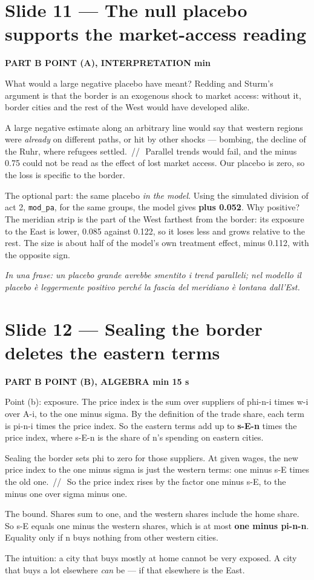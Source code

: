 \documentclass[11pt,a4paper]{article}
\newcommand{\slide}[3]{\Needspace{14\baselineskip}\section{#1}\textcolor{unicared}{\small\bfseries\MakeUppercase{#3}\quad\textperiodcentered\quad #2}\par}
\newcommand{\idea}[1]{\par{\small\itshape\color{unicablue}In una frase: #1}\par}
\newcommand{\pause}{\textcolor{unicared}{\,/\!/\,}}
\begin{document}
\slide{Slide 11 --- The null placebo supports the market-access reading}{1 min}{Part B \textperiodcentered{} point (a), interpretation}

\begin{say}
What would a large negative placebo have meant? Redding and Sturm's argument is that the border is an exogenous shock to market access: without it, border cities and the rest of the West would have developed alike.

A large negative estimate along an arbitrary line would say that western regions were \emph{already} on different paths, or hit by other shocks --- bombing, the decline of the Ruhr, where refugees settled. \pause\ Parallel trends would fail, and the minus 0.75 could not be read as the effect of lost market access. Our placebo is zero, so the loss is specific to the border.

The optional part: the same placebo \emph{in the model}. Using the simulated division of act 2, \texttt{mod\_pa}, for the same groups, the model gives \textbf{plus 0.052}. Why positive? The meridian strip is the part of the West farthest from the border: its exposure to the East is lower, 0.085 against 0.122, so it loses less and grows relative to the rest. The size is about half of the model's own treatment effect, minus 0.112, with the opposite sign.
\end{say}

\idea{un placebo grande avrebbe smentito i trend paralleli; nel modello il placebo è leggermente positivo perché la fascia del meridiano è lontana dall'Est.}

\slide{Slide 12 --- Sealing the border deletes the eastern terms}{1 min 15 s}{Part B \textperiodcentered{} point (b), algebra}

\begin{say}
Point (b): exposure. The price index is the sum over suppliers of phi-n-i times w-i over A-i, to the one minus sigma. By the definition of the trade share, each term is pi-n-i times the price index. So the eastern terms add up to \textbf{s-E-n} times the price index, where s-E-n is the share of n's spending on eastern cities.

Sealing the border sets phi to zero for those suppliers. At given wages, the new price index to the one minus sigma is just the western terms: one minus s-E times the old one. \pause\ So the price index rises by the factor one minus s-E, to the minus one over sigma minus one.

The bound. Shares sum to one, and the western shares include the home share. So s-E equals one minus the western shares, which is at most \textbf{one minus pi-n-n}. Equality only if n buys nothing from other western cities.

The intuition: a city that buys mostly at home cannot be very exposed. A city that buys a lot elsewhere \emph{can} be --- if that elsewhere is the East.
\end{say}
\end{document}

